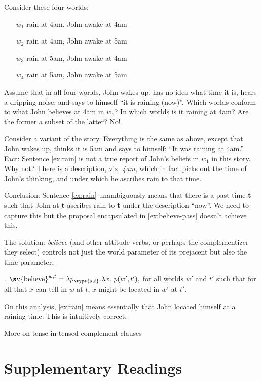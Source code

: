 Consider these four worlds:

\begin{itemize}
	\item[$w_1$] rain at 4am, John awake at 4am
	\item[$w_2$] rain at 4am, John awake at 5am
	\item[$w_3$] rain at 5am, John awake at 4am
	\item[$w_4$] rain at 5am, John awake at 5am
\end{itemize}

Assume that in all four worlds, John wakes up, has no idea what time it is, hears a dripping noise, and says to himself ``it is raining (now)''. Which worlds conform to what John believes at 4am in $w_1$? In which worlds is it raining at 4am? Are the former a subset of the latter? No!

Consider a variant of the story. Everything is the same as above, except that John wakes up, thinks it is 5am and says to himself: ``It was raining at 4am.'' Fact: Sentence \ref{ex:rain} is not a true report of John's beliefs in $w_1$ in this story. Why not? There is a description, viz. \emph{4am}, which in fact picks out the time of John's thinking, and under which he ascribes rain to that time.

Conclusion: Sentence \ref{ex:rain} unambiguously means that there is a past time \textbf{t} such that John at \textbf{t} ascribes rain to \textbf{t} under the description ``now''. We need to capture this but the proposal encapsulated in \ref{ex:believe-pass} doesn't achieve this.

The solution: \emph{believe} (and other attitude verbs, or perhaps the complementizer they select) controls not just the world parameter of its prejacent but also the time parameter.

\ex. $\sv{\text{believe}}^{w,t} = \lambda p_{\type{s,t}}. \lambda x.\ p(w',t'),$ for all worlds $w'$ and $t'$ such that for all that $x$ can tell in $w$ at $t$, $x$ might be located in $w'$ at $t'$.

On this analysis, \ref{ex:rain} means essentially that John located himself at a raining time. This is intuitively correct.

\bigskip\noindent\dash More on tense in tensed complement clauses \dash


\section*{Supplementary Readings} \label{sec:suppl-read-tense}

